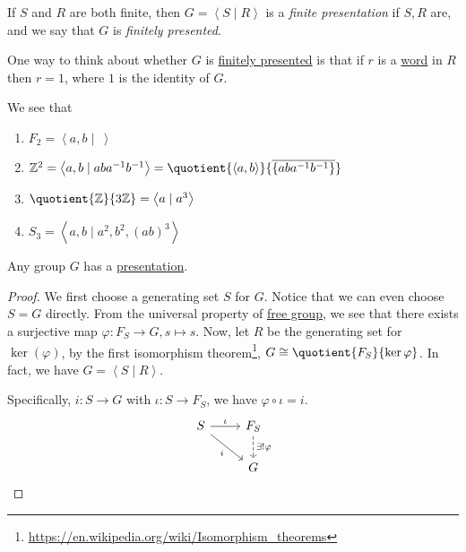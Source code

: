 \begin{definition}\label{def:finite-presentation}
	If \(S\) and \(R\) are both finite, then \(G = \left< S \mid R \right> \) is a \emph{finite presentation} if \(S, R\) are, and we say that \(G\) is \emph{finitely presented}.
\end{definition}
\begin{note}
	One way to think about whether \(G\) is \hyperref[def:finite-presentation]{finitely presented} is that if \(r\) is a
	\hyperref[def:word]{word} in \(R\) then \(r = 1\), where \(1\) is the identity of \(G\).
\end{note}

\begin{eg}
	We see that
	\begin{enumerate}[(1)]
		\item \(F_2 = \left< a, b \mid\ \right> \)
		\item \(\mathbb{\MakeUppercase{z}} ^2 = \left< a, b \mid aba^{-1} b^{-1}  \right> = \quotient{\left< a, b \right> }{\overline{\{aba^{-1} b^{-1} \}}} \)
		\item \(\quotient{\mathbb{\MakeUppercase{z}}}{3\mathbb{\MakeUppercase{z}}} = \left< a \mid a^3 \right> \)
		\item \(S_3 = \left< a, b \mid a^2, b^2, (ab)^3 \right> \)
	\end{enumerate}
\end{eg}

\begin{theorem}
	Any group \(G\) has a \hyperref[def:group-presentation]{presentation}.
\end{theorem}
\begin{proof}
	We first choose a generating set \(S\) for \(G\). Notice that we can even choose \(S = G\) directly. From the universal property of \hyperref[def:free-group]{free group},
	we see that there exists a surjective map \(\varphi \colon F_S \to G, s \mapsto s\). Now, let \(R\) be the generating set for \(\ker (\varphi) \),
	by the first isomorphism theorem\footnote{\url{https://en.wikipedia.org/wiki/Isomorphism_theorems}}, \(G\cong \quotient{F_S}{\ker  \varphi}\).
	In fact, we have \(G = \left< S \mid R \right> \).

	Specifically, \(i\colon S\to G\) with \(\iota \colon S\to F_S\), we have \(\varphi \circ \iota = i\).
	\[
		\begin{tikzcd}
			S \ar[rd, "i"']\ar[r, "\iota "] & F_S\ar[d, dashed, "\exists !\varphi"]\\
			& G
		\end{tikzcd}
	\]
\end{proof}

